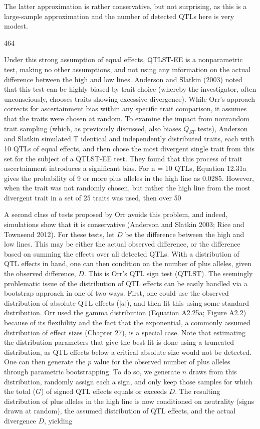 \documentclass{article}
\begin{document}
The latter approximation is rather conservative, but not surprising, as this is a large-sample approximation and the number of detected QTLs here is very modest.

464

Under this strong assumption of equal effects, QTLST-EE is a nonparametric test, making no other assumptions, and not using any information on the actual difference between the high and low lines. Anderson and Slatkin (2003) noted that this test can be highly biased by trait choice (whereby the investigator, often unconsciously, chooses traits showing excessive divergence). While Orr's approach corrects for ascertainment bias within any specific trait comparison, it assumes that the traits were chosen at random. To examine the impact from nonrandom trait sampling (which, as previously discussed, also biases  $ Q_{ST} $ tests), Anderson and Slatkin simulated T identical and independently distributed traits, each with 10 QTLs of equal effects, and then chose the most divergent single trait from this set for the subject of a QTLST-EE test. They found that this process of trait ascertainment introduces a significant bias. For n = 10 QTLs, Equation 12.31a gives the probability of 9 or more plus alleles in the high line as 0.0285. However, when the trait was not randomly chosen, but rather the high line from the most divergent trait in a set of 25 traits was used, then over 50%

A second class of tests proposed by Orr avoids this problem, and indeed, simulations show that it is conservative (Anderson and Slatkin 2003; Rice and Townsend 2012). For these tests, let $D$ be the difference between the high and low lines. This may be either the actual observed difference, or the difference based on summing the effects over all detected QTLs. With a distribution of QTL effects in hand, one can then condition on the number of plus alleles, given the observed difference, $D$. This is Orr's QTL sign test (QTLST). The seemingly problematic issue of the distribution of QTL effects can be easily handled via a bootstrap approach in one of two ways. First, one could use the observed distribution of absolute QTL effects ($|a|$), and then fit this using some standard distribution. Orr used the gamma distribution (Equation A2.25a; Figure A2.2) because of its flexibility and the fact that the exponential, a commonly assumed distribution of effect sizes (Chapter 27), is a special case. Note that estimating the distribution parameters that give the best fit is done using a truncated distribution, as QTL effects below a critical absolute size would not be detected. One can then generate the $p$ value for the observed number of plus alleles through parametric bootstrapping. To do so, we generate $n$ draws from this distribution, randomly assign each a sign, and only keep those samples for which the total ($G$) of signed QTL effects equals or exceeds $D$. The resulting distribution of plus alleles in the high line is now conditioned on neutrality (signs drawn at random), the assumed distribution of QTL effects, and the actual divergence $D$, yielding
\end{document}

